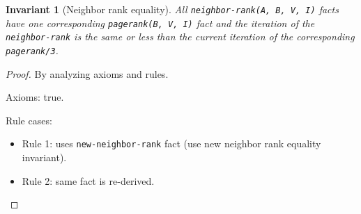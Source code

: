 \documentclass[9pt]{article}
\newtheorem{invariant}{Invariant}
\begin{document}
\begin{invariant}[Neighbor rank equality]
All \texttt{neighbor-rank(A, B, V, I)} facts have one corresponding
\texttt{pagerank(B, V, I)} fact and the iteration of the \texttt{neighbor-rank}
is the same or less than the current iteration of the corresponding
\texttt{pagerank/3}.
\end{invariant}
\begin{proof}
By analyzing axioms and rules.

Axioms: true.

Rule cases:

\begin{itemize}
   \item Rule 1: uses \texttt{new-neighbor-rank} fact (use new neighbor rank
         equality invariant).
   \item Rule 2: same fact is re-derived.
\end{itemize}
\end{proof}
\end{document}
